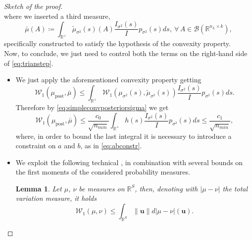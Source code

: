 \documentclass[a4paper, 11pt, reqno]{amsart}
\theoremstyle{plain}
\newtheorem{lemma}[theorem]{Lemma}
\theoremstyle{remark}
\theoremstyle{definition}
\newcommand{\wass}[3][2]{\mathcal{W}_{#1}\left(#2, #3\right)}
\newcommand{\real}{\mathbb{R}}
\newcommand{\borel}[1]{\mathcal{B}\left(#1\right)}
\newcommand{\norm}[1]{\left\lVert#1\right\rVert}
\let\oldforall\forall
\renewcommand{\forall}{\oldforall\,}
\begin{document}
\begin{proof}[Sketch of the proof]
\begin{equation}
    \end{equation}
    where we inserted a third measure,
    \begin{equation} \label{eq:barmu}
        \bar{\mu}(A) \coloneqq \int_{\real^+} \widetilde{\mu}_{\sigma^2}(s)(A) \frac{\mathit{I}_{\sigma^2}(s)}{\mathit{I}} p_{\sigma^2}(s) ds, \ \forall A \in \borel{\real^{n_L \times k}},
    \end{equation}
    specifically constructed to satisfy the hypothesis of the convexity property. \\
    Now, to conclude, we just need to control both the terms on the right-hand side of \cref{eq:trianstep}.
    \begin{itemize}[leftmargin = 2.5cm]
        \item[\textit{1\textsuperscript{st} term.}] We just apply the aforementioned convexity property getting
        \begin{equation*}
            \wass[1]{\mu_{\mathrm{post}}}{\bar{\mu}} \leq \int_{\real^+} \wass[1]{\mu_{\sigma^2}(s)}{\widetilde{\mu}_{\sigma^2}(s)} \frac{\mathit{I}_{\sigma^2}(s)}{\mathit{I}} p_{\sigma^2}(s) ds.
        \end{equation*}
        Therefore by \cref{eq:simpleconvposteriorsigma} we get 
        \begin{equation*}
            \wass[1]{\mu_{\mathrm{post}}}{\bar{\mu}} \leq \frac{c_0}{\sqrt{n_{min}}} \int_{\real^+} h(s) \frac{\mathit{I}_{\sigma^2}(s)}{\mathit{I}} p_{\sigma^2}(s) ds \leq \frac{c_1}{\sqrt{n_{min}}},
        \end{equation*}
        where, in order to bound the last integral it is necessary to introduce a constraint on $a$ and $b$, as in \cref{eq:abconstr}.
        \item[\textit{2\textsuperscript{nd} term.}] We exploit the following technical , in combination with several bounds on the first moments of the considered probability measures.
        \begin{lemma} \label{lem:boundwasstv}
            Let $\mu$, $\nu$ be measures on $\real^S$, then, denoting with $|\mu - \nu|$ the total variation measure, it holds
            \begin{equation*}
                \wass[1]{\mu}{\nu} \leq \int_{\real^S} \norm{\bm{u}} d |\mu - \nu|(\bm{u}).
            \end{equation*}
        \end{lemma}
    \end{itemize}
    \vskip-10pt
\end{proof}
\end{document}
